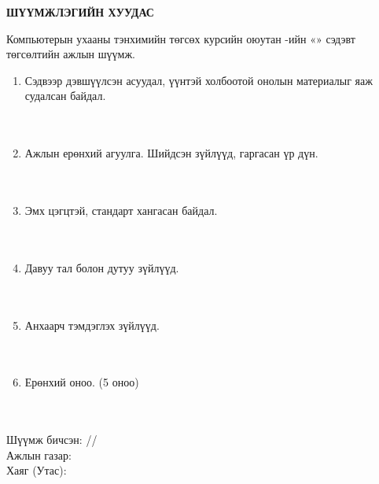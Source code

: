 \begin{titlepage}
\small
\begin{center}
{\scshape \univname\par}
{\scshape \facname\par}\vspace{0.3cm}
\textbf{ШҮҮМЖЛЭГИЙН ХУУДАС}
\end{center}
Компьютерын ухааны тэнхимийн төгсөх курсийн оюутан \shortname-ийн «\ttitle» сэдэвт төгсөлтийн ажлын шүүмж.

\newcommand{\reviewlines}{\makebox[\textwidth]{\dotfill}\\[0.15cm]\makebox[\textwidth]{\dotfill}\\[0.3cm]}
\begin{enumerate}
\item Сэдвээр дэвшүүлсэн асуудал, үүнтэй холбоотой онолын материалыг яаж судалсан байдал.\\ \reviewlines
\item Ажлын ерөнхий агуулга. Шийдсэн зүйлүүд, гаргасан үр дүн.\\ \reviewlines
\item Эмх цэгцтэй, стандарт хангасан байдал.\\ \reviewlines
\item Давуу тал болон дутуу зүйлүүд.\\ \reviewlines
\item Анхаарч тэмдэглэх зүйлүүд.\\ \reviewlines
\item Ерөнхий оноо. (5 оноо)\\ \reviewlines
\end{enumerate}
Шүүмж бичсэн: \makebox[5cm]{\dotfill} /\readname/\\[0.2cm]
Ажлын газар: \makebox[9cm]{\dotfill}\\[0.2cm]
Хаяг (Утас): \makebox[9cm]{\dotfill}
\end{titlepage}

%
%
%
